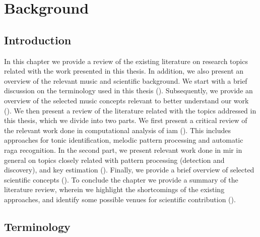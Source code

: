 
\chapter{Background}
\label{chap:background}

\section{Introduction}

In this chapter we provide a review of the existing literature on research topics related with the work presented in this thesis. In addition, we also present an overview of the relevant music and scientific background. We start with a brief discussion on the terminology used in this thesis (). Subsequently, we provide an overview of the selected music concepts relevant to better understand our work (). We then present a review of the literature related with the topics addressed in this thesis, which we divide into two parts. We first present a critical review of the relevant work done in computational analysis of \gls{iam} (). This includes approaches for tonic identification, melodic pattern processing and automatic \gls{raga} recognition. In the second part, we present relevant work done in \gls{mir} in general on topics closely related with pattern processing (detection and discovery), and key estimation (). Finally, we provide a brief overview of selected scientific concepts (). To conclude the chapter we provide a summary of the literature review, wherein we highlight the shortcomings of the existing approaches, and identify some possible venues for scientific contribution (). 



\section{Terminology}
\label{sec:background_terminology}

